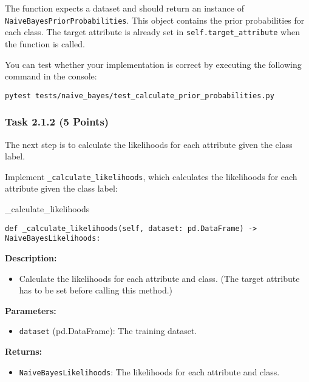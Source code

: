\documentclass[
english,
smallborders
]{i6prcsht}
\newcommand{\points}[1]{\hfill \color{red}(#1 Points)\color{black}}
\begin{document}
\vspace*{0.5cm}

The function expects a dataset and should return an instance of \texttt{NaiveBayesPriorProbabilities}. This object contains the prior probabilities for each class. The target attribute is already set in \texttt{self.target\_attribute} when the function is called.

You can test whether your implementation is correct by executing the following command in the console:

\vspace*{0.3cm}

\begin{lstlisting}
pytest tests/naive_bayes/test_calculate_prior_probabilities.py
\end{lstlisting}

\newpage

\subsubsection*{Task 2.1.2 \points{5}}

The next step is to calculate the likelihoods for each attribute given the class label.

Implement \texttt{\_calculate\_likelihoods}, which calculates the likelihoods for each attribute given the class label:

\vspace*{0.3cm}

\begin{functionbox}{\_calculate\_likelihoods}
	\begin{lstlisting}[numbers=none]
def _calculate_likelihoods(self, dataset: pd.DataFrame) -> NaiveBayesLikelihoods:
\end{lstlisting}
	
	\textbf{Description:}
	\begin{itemize}[leftmargin=*,topsep=0pt]
		\item Calculate the likelihoods for each attribute and class. (The target attribute has to be set before calling this method.)
	\end{itemize}
	
	\textbf{Parameters:}
	\begin{itemize}[leftmargin=*,topsep=0pt]
		\item \texttt{dataset} (pd.DataFrame): The training dataset.
	\end{itemize}
	
	\textbf{Returns:}
	\begin{itemize}[leftmargin=*,topsep=0pt]
		\item \texttt{NaiveBayesLikelihoods}: The likelihoods for each attribute and class.
	\end{itemize}
\end{functionbox}
\end{document}

